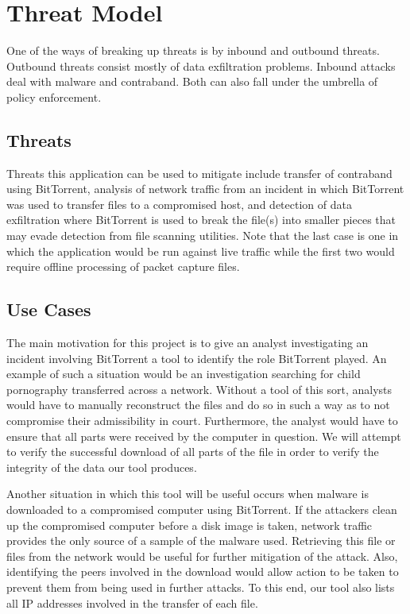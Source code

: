\documentclass{acm_proc_article-sp}
\begin{document}
\section{Threat Model}
One of the ways of breaking up threats is by inbound and outbound threats.
Outbound threats consist mostly of data exfiltration problems.  Inbound attacks
deal with malware and contraband.  Both can also fall under the umbrella of
policy enforcement.

\subsection{Threats}
Threats this application can be used to mitigate include transfer of contraband
using BitTorrent, analysis of network traffic from an incident in which
BitTorrent was used to transfer files to a compromised host, and detection of
data exfiltration where BitTorrent is used to break the file(s) into smaller
pieces that may evade detection from file scanning utilities. Note that the
last case is one in which the application would be run against live traffic
while the first two would require offline processing of packet capture files.


\subsection{Use Cases}
The main motivation for this project is to give an analyst investigating an
incident involving BitTorrent a tool to identify the role BitTorrent played.  An
example of such a situation would be an investigation searching for child
pornography transferred across a network. Without a tool of this sort, analysts
would have to manually reconstruct the files and do so in such a way as to not
compromise their admissibility in court. Furthermore, the analyst would have to
ensure that all parts were received by the computer in question. We will attempt
to verify the successful download of all parts of the file in order to verify
the integrity of the data our tool produces.

Another situation in which this tool will be useful occurs when malware is
downloaded to a compromised computer using BitTorrent. If the attackers clean up
the compromised computer before a disk image is taken, network traffic
provides the only source of a sample of the malware used. Retrieving this file
or files from the network would be useful for further mitigation of the
attack. Also, identifying the peers involved in the download would allow action
to be taken to prevent them from being used in further attacks. To this end, our
tool also lists all IP addresses involved in the transfer of each file.
\end{document}
